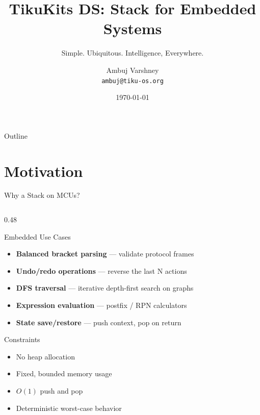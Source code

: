 \documentclass[aspectratio=169, 10pt]{beamer}
\title[TikuKits DS]{TikuKits DS: Stack for Embedded Systems}
\subtitle{Simple. Ubiquitous. Intelligence, Everywhere.}
\author[Ambuj Varshney]{Ambuj Varshney \\ \texttt{ambuj@tiku-os.org}}
\date{\today}
\begin{document}
\begin{frame}
\titlepage
\end{frame}

\begin{frame}{Outline}
\tableofcontents
\end{frame}

\section{Motivation}

\begin{frame}{Why a Stack on MCUs?}
\begin{columns}[T]
\begin{column}{0.48\textwidth}
\begin{block}{Embedded Use Cases}
\begin{itemize}
  \item \textbf{Balanced bracket parsing} --- validate protocol frames
  \item \textbf{Undo/redo operations} --- reverse the last N actions
  \item \textbf{DFS traversal} --- iterative depth-first search on graphs
  \item \textbf{Expression evaluation} --- postfix / RPN calculators
  \item \textbf{State save/restore} --- push context, pop on return
\end{itemize}
\end{block}

\begin{block}{Constraints}
\begin{itemize}
  \item No heap allocation
  \item Fixed, bounded memory usage
  \item $O(1)$ push and pop
  \item Deterministic worst-case behavior
\end{itemize}
\end{block}
\end{column}


\end{columns}
\end{frame}
\end{document}
